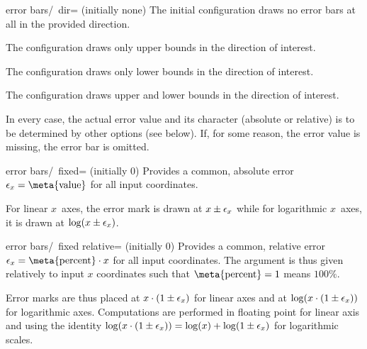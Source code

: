 {\begin{pgfplotsxykey}{error bars/\x\ dir= (initially none)}
    The initial configuration  draws no error bars at all
    in the provided direction.

    The configuration  draws only upper bounds in the
    direction of interest.

    The configuration  draws only lower bounds in the
    direction of interest.

    The configuration  draws upper and lower bounds in
    the direction of interest.

    In every case, the actual error value and its character (absolute or
    relative) is to be determined by other options (see below). If, for some
    reason, the error value is missing, the error bar is omitted.
\end{pgfplotsxykey}

\begin{pgfplotsxykey}{error bars/\x\ fixed= (initially 0)}
    Provides a common, absolute error $\pgfplotserror x=\text{\meta{value}}$
    for all input coordinates.
\begin{codeexample}[]
\end{codeexample}

    For linear $x$~axes, the error mark is drawn at $x \pm \epsilon_{x}$
    while for logarithmic $x$~axes, it is drawn at $\log( x \pm \epsilon_{x})$.
\end{pgfplotsxykey}

\begin{pgfplotsxykey}{error bars/\x\ fixed relative= (initially 0)}
    Provides a common, relative error $\pgfplotserror x = \text{\meta{percent}}
    \cdot x$ for all input coordinates. The argument  is thus
    given relatively to input $x$ coordinates such that $\text{\meta{percent}}
    = 1$ means $100\%$.

    Error marks are thus placed at $x \cdot (1 \pm \epsilon_{x})$ for
    linear axes and at $\log(x \cdot (1 \pm \epsilon_{x}))$ for logarithmic
    axes. Computations are performed in floating point for linear axis and
    using the identity $\log(x \cdot (1 \pm \epsilon_{x})) = \log(x) +
    \log( 1 \pm \epsilon_{x})$ for logarithmic scales.


\end{pgfplotsxykey}}
